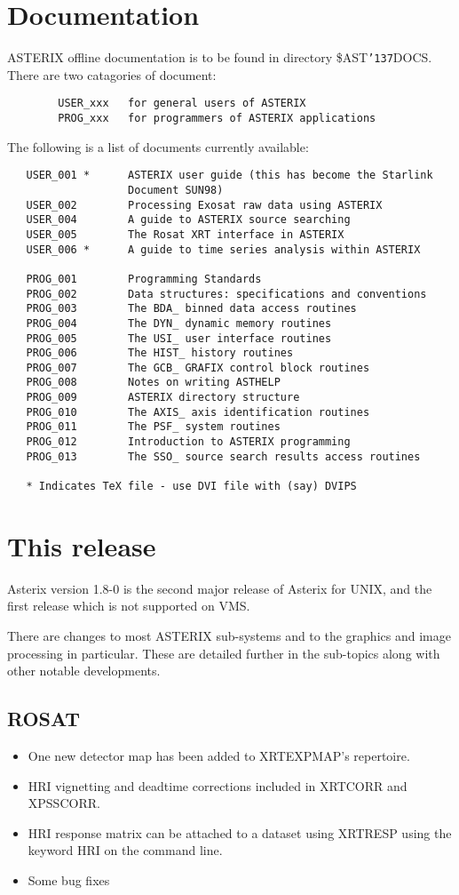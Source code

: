 \documentclass{book}
\renewcommand{\_}{{\tt\char'137}}     %
\begin{document}
\chapter{Documentation}
ASTERIX offline documentation is to be found in directory
\$AST\_DOCS. There are two catagories of document:
\begin{verbatim}
        USER_xxx   for general users of ASTERIX
        PROG_xxx   for programmers of ASTERIX applications
\end{verbatim}
The following is a list of documents currently available:
\begin{verbatim}
   USER_001 *      ASTERIX user guide (this has become the Starlink
                   Document SUN98)
   USER_002        Processing Exosat raw data using ASTERIX
   USER_004        A guide to ASTERIX source searching
   USER_005        The Rosat XRT interface in ASTERIX
   USER_006 *      A guide to time series analysis within ASTERIX

   PROG_001        Programming Standards
   PROG_002        Data structures: specifications and conventions
   PROG_003        The BDA_ binned data access routines
   PROG_004        The DYN_ dynamic memory routines
   PROG_005        The USI_ user interface routines
   PROG_006        The HIST_ history routines
   PROG_007        The GCB_ GRAFIX control block routines
   PROG_008        Notes on writing ASTHELP
   PROG_009        ASTERIX directory structure
   PROG_010        The AXIS_ axis identification routines
   PROG_011        The PSF_ system routines
   PROG_012        Introduction to ASTERIX programming
   PROG_013        The SSO_ source search results access routines

   * Indicates TeX file - use DVI file with (say) DVIPS
   \end{verbatim}
\chapter{This release}
Asterix version 1.8-0 is the second major release of Asterix for UNIX,
and the first release which is not supported on VMS.

There are changes to most ASTERIX sub-systems and to the graphics and
image processing in particular. These are detailed
further in the sub-topics along with other notable developments.

\section{ROSAT}
\begin{itemize}
\item One new detector map has been added to XRTEXPMAP's repertoire.
\item HRI vignetting and deadtime corrections included in XRTCORR and XPSSCORR.
\item HRI response matrix can be attached to a dataset using
XRTRESP using the keyword HRI on the command line.

\item Some bug fixes
\end{itemize}
\end{document}
